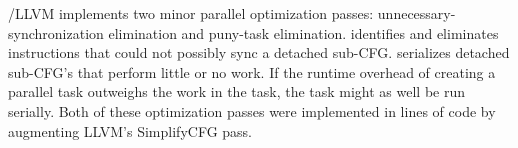 \tapir/LLVM implements two minor parallel optimization passes:
unnecessary-synchronization elimination and puny-task elimination.
 identifies and
eliminates \sync instructions that could not possibly sync a detached
sub-CFG\@.   serializes detached sub-CFG's
that perform little or no work.  If the runtime overhead of creating a
parallel task outweighs the work in the task, the task might as well
be run serially.  Both of these optimization passes were implemented
in  lines of code by augmenting LLVM's
SimplifyCFG pass.


